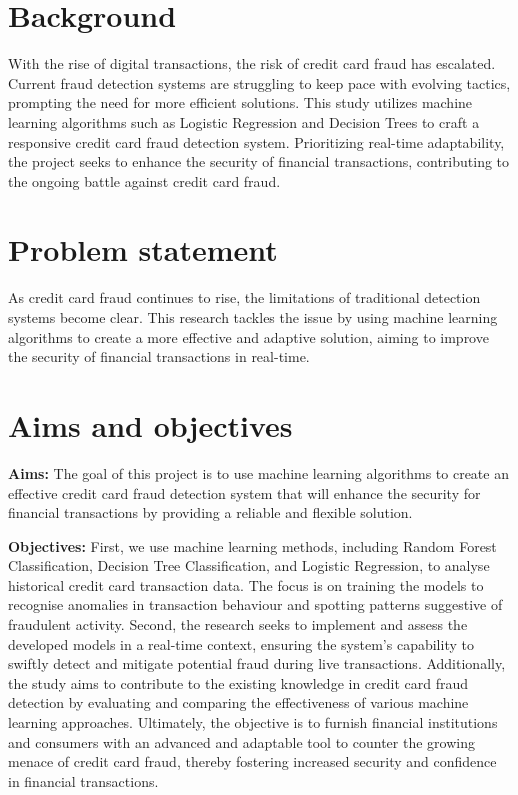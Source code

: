 \section{Background}
\label{sec:into_back}


With the rise of digital transactions, the risk of credit card fraud has escalated. Current fraud detection systems are struggling to keep pace with evolving tactics, prompting the need for more efficient solutions. This study utilizes machine learning algorithms such as Logistic Regression and Decision Trees to craft a responsive credit card fraud detection system. Prioritizing real-time adaptability, the project seeks to enhance the security of financial transactions, contributing to the ongoing battle against credit card fraud.

\section{Problem statement}
\label{sec:intro_prob_art}
As credit card fraud continues to rise, the limitations of traditional detection systems become clear. This research tackles the issue by using machine learning algorithms to create a more effective and adaptive solution, aiming to improve the security of financial transactions in real-time.

\section{Aims and objectives}
\label{sec:intro_aims_obj}


\textbf{Aims:} The goal of this project is to use machine learning algorithms to create an effective credit card fraud detection system that will enhance the security for financial transactions by providing a reliable and flexible solution.




\textbf{Objectives:} First, we use machine learning methods, including Random Forest Classification, Decision Tree Classification, and Logistic Regression, to analyse historical credit card transaction data. The focus is on training the models to recognise anomalies in transaction behaviour and spotting patterns suggestive of fraudulent activity. Second, the research seeks to implement and assess the developed models in a real-time context, ensuring the system's capability to swiftly detect and mitigate potential fraud during live transactions. Additionally, the study aims to contribute to the existing knowledge in credit card fraud detection by evaluating and comparing the effectiveness of various machine learning approaches. Ultimately, the objective is to furnish financial institutions and consumers with an advanced and adaptable tool to counter the growing menace of credit card fraud, thereby fostering increased security and confidence in financial transactions.



